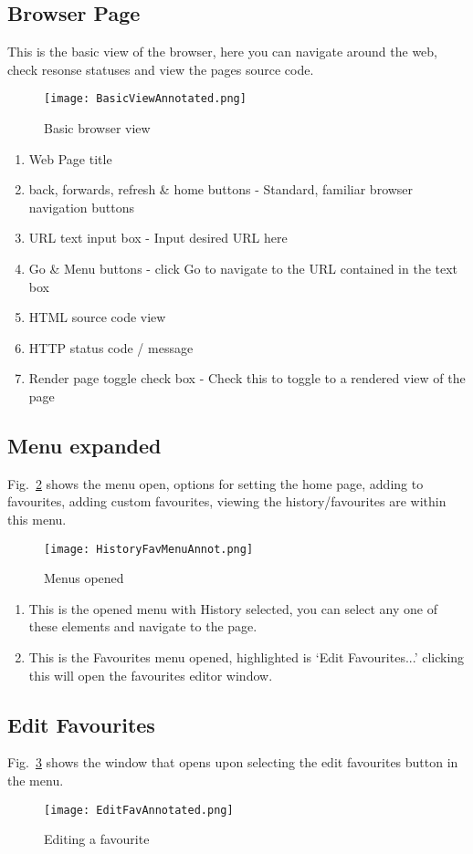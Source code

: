 \documentclass[../Main.tex]{subfiles}
\begin{document}
\subsection{Browser Page}
This is the basic view of the browser, here you can navigate around the web, check resonse statuses and view the pages source code.
\begin{figure}[H]
    \texttt{[image: BasicViewAnnotated.png]}
    \caption{Basic browser view}
    \label{fig:BasicView}
\end{figure}
\begin{enumerate}
    \item Web Page title
    \item back, forwards, refresh \& home buttons - Standard, familiar browser navigation buttons
    \item URL text input box - Input desired URL here
    \item Go \& Menu buttons - click Go to navigate to the URL contained in the text box
    \item HTML source code view
    \item HTTP status code / message
    \item Render page toggle check box - Check this to toggle to a rendered view of the page
\end{enumerate}

\subsection{Menu expanded}
Fig.~\ref{fig:MenuExpanded} shows the menu open, options for setting the home page, adding to favourites, adding custom favourites, viewing the history/favourites are within this menu.
\begin{figure}[H]
    \texttt{[image: HistoryFavMenuAnnot.png]}
    \caption{Menus opened}
    \label{fig:MenuExpanded}
\end{figure}

\begin{enumerate}
    \item This is the opened menu with History selected, you can select any one of these elements and navigate to the page.
    \item This is the Favourites menu opened, highlighted is `Edit Favourites...' clicking this will open the favourites editor window.
\end{enumerate}

\subsection{Edit Favourites}
Fig.~\ref{fig:EditFavourite} shows the window that opens upon selecting the edit favourites button in the menu.
\begin{figure}[H]
    \texttt{[image: EditFavAnnotated.png]}
    \caption{Editing a favourite}
    \label{fig:EditFavourite}
\end{figure}
\end{document}
